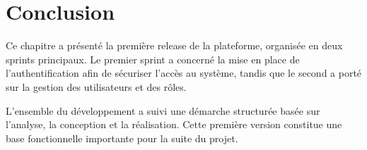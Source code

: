 \section{Conclusion}
Ce chapitre a présenté la première release de la plateforme, organisée en deux sprints principaux. Le premier sprint a concerné la mise en place de l’authentification afin de sécuriser l’accès au système, tandis que le second a porté sur la gestion des utilisateurs et des rôles.

\noindent L’ensemble du développement a suivi une démarche structurée basée sur l’analyse, la conception et la réalisation. Cette première version constitue une base fonctionnelle importante pour la suite du projet.